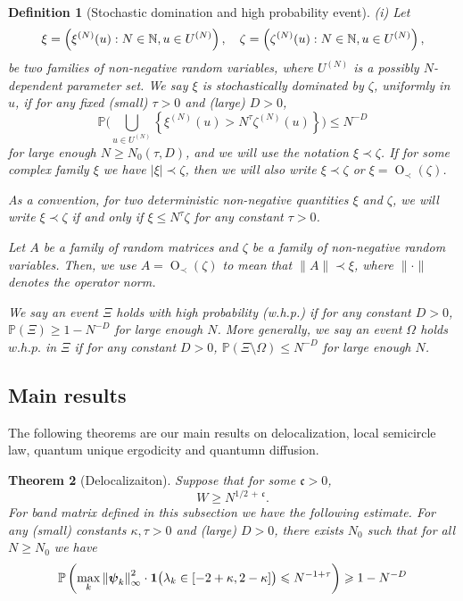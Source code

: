 \documentclass[10pt,reqno]{article}
\def\P{\mathbb{P}}
\DeclareMathOperator{\OO}{O}
\theoremstyle{plain} %
\newtheorem{theorem}{Theorem}[section]
\newtheorem{definition}[theorem]{Definition}
\theoremstyle{remark}
\numberwithin{equation}{section}
\begin{document}
\begin{definition}[Stochastic domination and high probability event]\label{stoch_domination}
	{\rm{(i)}} Let
	\[\xi=\left(\xi^{(N)}(u):N\in\mathbb N, u\in U^{(N)}\right),\hskip 10pt \zeta=\left(\zeta^{(N)}(u):N\in\mathbb N, u\in U^{(N)}\right),\]
	be two families of non-negative random variables, where $U^{(N)}$ is a possibly $N$-dependent parameter set. We say $\xi$ is stochastically dominated by $\zeta$, uniformly in $u$, if for any fixed (small) $\tau>0$ and (large) $D>0$, 
	\[\mathbb P\bigg(\bigcup_{u\in U^{(N)}}\left\{\xi^{(N)}(u)>N^\tau\zeta^{(N)}(u)\right\}\bigg)\le N^{-D}\]
	for large enough $N\ge N_0(\tau, D)$, and we will use the notation $\xi\prec\zeta$. 
		If for some complex family $\xi$ we have $|\xi|\prec\zeta$, then we will also write $\xi \prec \zeta$ or $\xi=\OO_\prec(\zeta)$. 
	
	\vspace{5pt}
	 As a convention, for two deterministic non-negative quantities $\xi$ and $\zeta$, we will write $\xi\prec\zeta$ if and only if $\xi\le N^\tau \zeta$ for any constant $\tau>0$. 

 \vspace{5pt}
	 Let $A$ be a family of random matrices and $\zeta$ be a family of non-negative random variables. Then, we use $A=\OO_\prec(\zeta)$ to mean that $\|A\|\prec \xi$, where $\|\cdot\|$ denotes the operator norm. 
	
	\vspace{5pt}
	 We say an event $\Xi$ holds with high probability (w.h.p.) if for any constant $D>0$, $\mathbb P(\Xi)\ge 1- N^{-D}$ for large enough $N$. More generally, we say an event $\Omega$ holds $w.h.p.$ in $\Xi$ if for any constant $D>0$,
	$\P( \Xi\setminus \Omega)\le N^{-D}$ for large enough $N$.
\end{definition}

\subsection{Main results}

The following theorems are our main results on delocalization,  local semicircle law, quantum unique ergodicity and quantumn diffusion.

\begin{theorem}[Delocalizaiton]\label{MR:decol}
Suppose  that for some  $ \mathfrak c>0$, 
\begin{equation}\label{Main_DEL_COND}
    W \ge N^{1/2\,+\,\mathfrak c}. 
\end{equation}
For  band matrix defined in this subsection we have the following estimate. 
For any (small) constants $\kappa, \tau>0$ and (large) $D>0$, there exists $N_0$ such that for all $N \geqslant N_0$ we have
$$
\mathbb{P}\left( \max_k\left\|\boldsymbol{\psi}_k\right\|_{\infty}^2 \cdot {\bf1}\big(\lambda_k\in[-2+\kappa,2-\kappa]\big)\leqslant N^{-1+\tau}  \right) \geqslant 1-N^{-D}
$$
\end{theorem}
\end{document}
